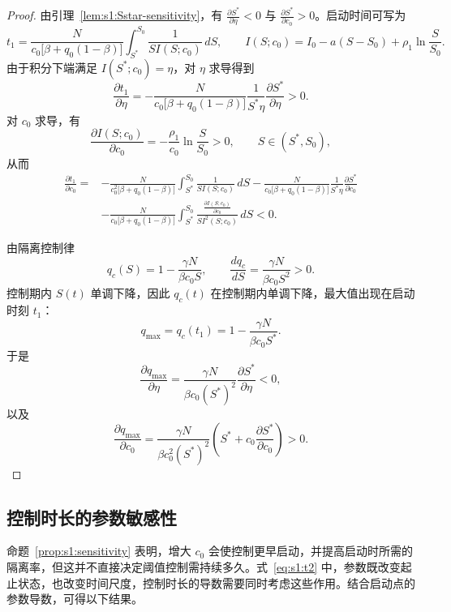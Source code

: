 \documentclass[UTF8,a4paper,10pt,fontset=fandol]{ctexart}
\theoremstyle{cnplain}
\theoremstyle{remark}
\numberwithin{equation}{section}
\begin{document}
\begin{proof}
由引理~\ref{lem:s1:Sstar-sensitivity}，有
$\frac{\partial S^*}{\partial \eta}<0$ 与 $\frac{\partial S^*}{\partial c_0}>0$。启动时间可写为
\begin{equation}
t_1
=
\frac{N}{c_0\bigl[\beta+q_0(1-\beta)\bigr]}
\int_{S^*}^{S_0}
\frac{1}{S I(S;c_0)}\,dS,
\qquad
I(S;c_0)
=
I_0-a(S-S_0)+\rho_1\ln\frac{S}{S_0}.
\end{equation}
由于积分下端满足 $I(S^*;c_0)=\eta$，对 $\eta$ 求导得到
\begin{equation}
\frac{\partial t_1}{\partial \eta}
=
-\frac{N}{c_0\bigl[\beta+q_0(1-\beta)\bigr]}
\frac{1}{S^*\eta}
\frac{\partial S^*}{\partial \eta}>0.
\end{equation}
对 $c_0$ 求导，有
\[
\frac{\partial I(S;c_0)}{\partial c_0}
=
-\frac{\rho_1}{c_0}\ln\frac{S}{S_0}>0,
\qquad S\in(S^*,S_0),
\]
从而
\begin{align}
\frac{\partial t_1}{\partial c_0}
=&
-\frac{N}{c_0^2\bigl[\beta+q_0(1-\beta)\bigr]}
\int_{S^*}^{S_0}\frac{1}{S I(S;c_0)}\,dS
-\frac{N}{c_0\bigl[\beta+q_0(1-\beta)\bigr]}
\frac{1}{S^*\eta}
\frac{\partial S^*}{\partial c_0} \nonumber\\
&-\frac{N}{c_0\bigl[\beta+q_0(1-\beta)\bigr]}
\int_{S^*}^{S_0}
\frac{\frac{\partial I(S;c_0)}{\partial c_0}}{S I^2(S;c_0)}\,dS
<0.
\end{align}


由隔离控制律
\[
q_c(S)=1-\frac{\gamma N}{\beta c_0S},
\qquad
\frac{dq_c}{dS}
=
\frac{\gamma N}{\beta c_0S^2}>0.
\]
控制期内 $S(t)$ 单调下降，因此 $q_c(t)$ 在控制期内单调下降，最大值出现在启动时刻 $t_1$：
\[
q_{\max}
=
q_c(t_1)
=
1-\frac{\gamma N}{\beta c_0S^*}.
\]
于是
\[
\frac{\partial q_{\max}}{\partial \eta}
=
\frac{\gamma N}{\beta c_0(S^*)^2}\frac{\partial S^*}{\partial \eta}<0,
\]
以及
\[
\frac{\partial q_{\max}}{\partial c_0}
=
\frac{\gamma N}{\beta c_0^2(S^*)^2}
\left(S^*+c_0\frac{\partial S^*}{\partial c_0}\right)>0.
\]
\end{proof}

\subsection{控制时长的参数敏感性}
命题~\ref{prop:s1:sensitivity} 表明，增大 $c_0$ 会使控制更早启动，并提高启动时所需的隔离率，但这并不直接决定阈值控制需持续多久。式~\eqref{eq:s1:t2} 中，参数既改变起止状态，也改变时间尺度，控制时长的导数需要同时考虑这些作用。结合启动点的参数导数，可得以下结果。
\end{document}
